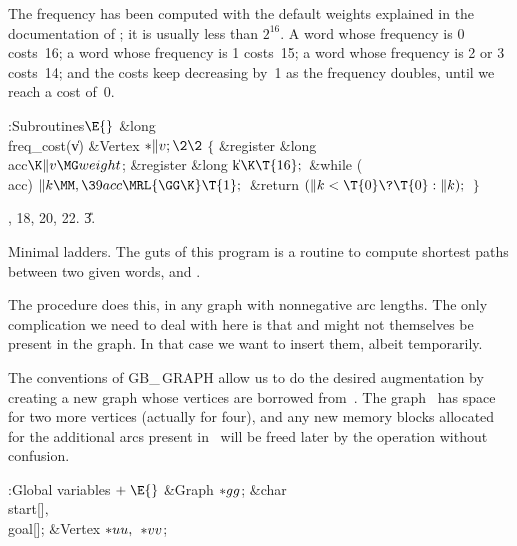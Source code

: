 The frequency has been computed with the default weights explained in the
documentation of ; it is usually less than $2^{16}$.
A word whose frequency is 0 costs~16; a word whose frequency is 1 costs~15;
a word whose frequency is 2 or 3 costs~14; and the costs keep decreasing
by~1 as the frequency doubles, until we reach a cost of~0.

\Y\B\4:Subroutines\X${}\E{}$\6
\1\1\&{long} \\{freq\_cost}(\|v)\6
\&{Vertex} ${}{*}\|v;\2\2{}$\6
${}\{{}$\5
\1\&{register} \&{long} \\{acc}${}\K\|v\MG\\{weight}{}$;\6
\&{register} \&{long} \|k${}\K\T{16};{}$\7
\&{while} (\\{acc})\1\5
${}\|k\MM,\39\\{acc}\MRL{{\GG}{\K}}\T{1};{}$\2\6
\&{return} ${}(\|k<\T{0}\?\T{0}:\|k);{}$\6
\4${}\}{}$\2\par
{}, 18, 20, 22.
\U3.\fi

Minimal ladders. The guts of this program is a routine to compute
shortest
paths between two given words,  and .

The  procedure does this, in any graph with nonnegative arc
lengths.
The only complication we need to deal with here is that  and 
might not themselves be present in the graph. In that case we want to insert
them, albeit temporarily.

The conventions of {\sc GB\_\,GRAPH} allow us to do the desired augmentation
by creating a new graph  whose vertices are borrowed from~.
The
graph~ has space for two more vertices (actually for four), and any
new memory blocks allocated for the additional arcs present in~ will
be freed later by the operation  without confusion.

\Y\B\4:Global variables\X${}\mathrel+\E{}$\6
\&{Graph} ${}{*}\\{gg}{}$;\6
\&{char} \\{start}[]${},{}$ \\{goal}[];\6
\&{Vertex} ${}{*}\\{uu},{}$ ${}{*}\\{vv}{}$;\par
\fi

